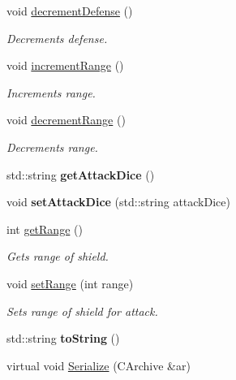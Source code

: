 \begin{DoxyCompactItemize}
\hypertarget{class_shield_a90fe2bbca5c029c88715490c5525e1a6}{}\label{class_shield_a90fe2bbca5c029c88715490c5525e1a6} 
void \hyperlink{class_shield_a90fe2bbca5c029c88715490c5525e1a6}{decrement\+Defense} ()
\begin{DoxyCompactList}\small\item\em Decrements defense. \end{DoxyCompactList}\item 
\hypertarget{class_shield_a2e36b34d593ce4de9066c206c3528846}{}\label{class_shield_a2e36b34d593ce4de9066c206c3528846} 
void \hyperlink{class_shield_a2e36b34d593ce4de9066c206c3528846}{increment\+Range} ()
\begin{DoxyCompactList}\small\item\em Increments range. \end{DoxyCompactList}\item 
\hypertarget{class_shield_afeb7f31a542d80ededa37980f13df576}{}\label{class_shield_afeb7f31a542d80ededa37980f13df576} 
void \hyperlink{class_shield_afeb7f31a542d80ededa37980f13df576}{decrement\+Range} ()
\begin{DoxyCompactList}\small\item\em Decrements range. \end{DoxyCompactList}\item 
\hypertarget{class_shield_adca98dd6afb94104adbdadde591ae1e2}{}\label{class_shield_adca98dd6afb94104adbdadde591ae1e2} 
std\+::string {\bfseries get\+Attack\+Dice} ()
\item 
\hypertarget{class_shield_a69ddf60fb2bfe723051f535b8f1f5cd6}{}\label{class_shield_a69ddf60fb2bfe723051f535b8f1f5cd6} 
void {\bfseries set\+Attack\+Dice} (std\+::string attack\+Dice)
\item 
\hypertarget{class_shield_af8b6fccff0ddb7851440da08b4c76c8f}{}\label{class_shield_af8b6fccff0ddb7851440da08b4c76c8f} 
int \hyperlink{class_shield_af8b6fccff0ddb7851440da08b4c76c8f}{get\+Range} ()
\begin{DoxyCompactList}\small\item\em Gets range of shield. \end{DoxyCompactList}\item 
\hypertarget{class_shield_a7e0638047be589b3ab2ca0c1349f3409}{}\label{class_shield_a7e0638047be589b3ab2ca0c1349f3409} 
void \hyperlink{class_shield_a7e0638047be589b3ab2ca0c1349f3409}{set\+Range} (int range)
\begin{DoxyCompactList}\small\item\em Sets range of shield for attack. \end{DoxyCompactList}\item 
\hypertarget{class_shield_a524d5884f91f2539db047cecd09d6bc8}{}\label{class_shield_a524d5884f91f2539db047cecd09d6bc8} 
std\+::string {\bfseries to\+String} ()
\item 
virtual void \hyperlink{class_shield_a8d045c43b16aab5fc474e696cb8a7f1f}{Serialize} (C\+Archive \&ar)
\end{DoxyCompactItemize}
